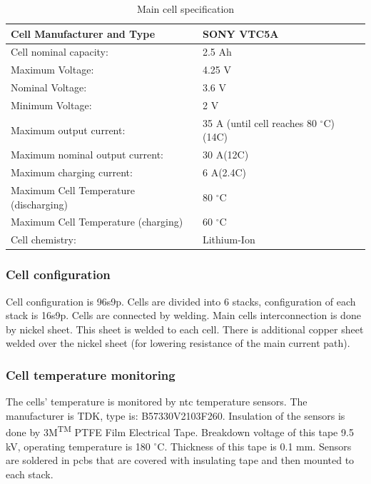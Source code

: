\begin{table}[H]
	\centering
	\caption{Main cell specification}
	\begin{tabu}{|X|X|}
		\hline
		Cell Manufacturer and Type & SONY VTC5A \\
		\hline
		Cell nominal capacity: & 2.5 Ah \\
		\hline
		Maximum Voltage: & 4.25 V \\
		\hline
		Nominal Voltage: & 3.6 V \\
		\hline
		Minimum Voltage:  & 2 V \\
		\hline
		Maximum output current: & 35 A (until cell reaches 80 $^\circ$C) (14C)\\
		\hline
		Maximum nominal output current: & 30 A(12C) \\
		\hline
		Maximum charging current: & 6 A(2.4C) \\
		\hline
		Maximum Cell Temperature (discharging) & 80 $^\circ$C \\
		\hline
		Maximum Cell Temperature (charging) & 60 $^\circ$C \\
		\hline
		Cell chemistry: & Lithium-Ion \\
		\hline
	\end{tabu}%
	\label{tab:acc-cell}%
\end{table}%

\subsubsection{Cell configuration}

Cell configuration is 96s9p. Cells are divided into 6 stacks, configuration of each stack is 16s9p. Cells are connected by welding. Main cells interconnection is done by nickel sheet. This sheet is welded to each cell. There is additional copper sheet welded over the nickel sheet (for lowering resistance of the main current path).

 
\subsubsection{Cell temperature monitoring}

	The cells’ temperature is monitored by \gls{ntc} temperature sensors. The manufacturer is TDK, type is: B57330V2103F260. Insulation of the sensors is done by 3M\textsuperscript{TM} PTFE Film Electrical Tape. Breakdown voltage of this tape 9.5 kV, operating temperature is 180 $^\circ$C. Thickness of this tape is 0.1 mm. Sensors are soldered in \glspl{pcb} that are covered with insulating tape and then mounted to each stack. 

